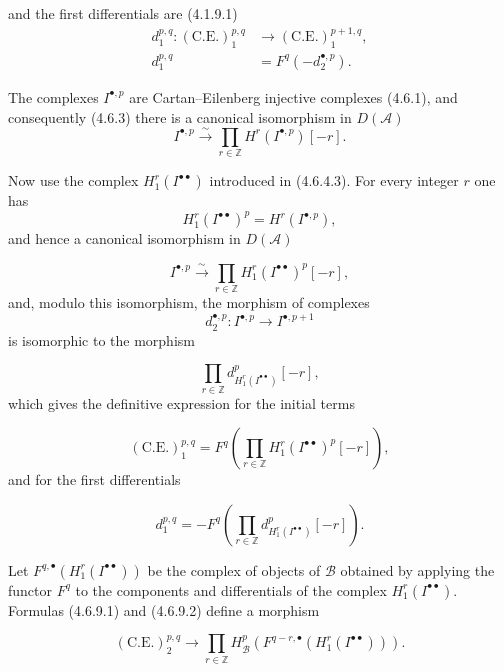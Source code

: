 \clearpage
{}%
\begingroup\small\setlength{\parskip}{0pt}\setlength{\emergencystretch}{1.5em}
\setlength{\abovedisplayskip}{4pt plus 2pt minus 2pt}%
\setlength{\belowdisplayskip}{4pt plus 2pt minus 2pt}%

\noindent and the first differentials are (4.1.9.1)
\[
\begin{aligned}
d_1^{p,q}\colon(\mathrm{C.E.})_1^{p,q}
  &\longrightarrow(\mathrm{C.E.})_1^{p+1,q},\\
d_1^{p,q}&=F^q(-d_2^{\bullet,p}).
\end{aligned}
\]

The complexes $I^{\bullet,p}$ are Cartan--Eilenberg injective complexes
(4.6.1), and consequently (4.6.3) there is a canonical isomorphism in
$D(\mathcal A)$
\[
I^{\bullet,p}\xrightarrow{\sim}
\prod_{r\in\mathbb Z}H^r(I^{\bullet,p})[-r].
\]

Now use the complex $H_1^r(I^{\bullet\bullet})$ introduced in (4.6.4.3).
For every integer $r$ one has
\[
H_1^r(I^{\bullet\bullet})^p=H^r(I^{\bullet,p}),
\]
and hence a canonical isomorphism in $D(\mathcal A)$

\[
I^{\bullet,p}\xrightarrow{\sim}
\prod_{r\in\mathbb Z}H_1^r(I^{\bullet\bullet})^p[-r],
\]
and, modulo this isomorphism, the morphism of complexes
\[
d_2^{\bullet,p}\colon
I^{\bullet,p}\longrightarrow I^{\bullet,p+1}
\]
is isomorphic to the morphism

\[
\prod_{r\in\mathbb Z}
d_{H_1^r(I^{\bullet\bullet})}^{p}[-r],
\]
which gives the definitive expression for the initial terms

\[
(\mathrm{C.E.})_1^{p,q}
=F^q\left(
\prod_{r\in\mathbb Z}H_1^r(I^{\bullet\bullet})^p[-r]
\right),
\tag{4.6.9.1}
\]
and for the first differentials

\[
d_1^{p,q}
=-F^q\left(
\prod_{r\in\mathbb Z}d_{H_1^r(I^{\bullet\bullet})}^{p}[-r]
\right).
\tag{4.6.9.2}
\]

Let $F^{q,\bullet}(H_1^r(I^{\bullet\bullet}))$ be the complex of objects
of $\mathcal B$ obtained by applying the functor $F^q$ to the components
and differentials of the complex $H_1^r(I^{\bullet\bullet})$. Formulas
(4.6.9.1) and (4.6.9.2) define a morphism

\[
(\mathrm{C.E.})_2^{p,q}\longrightarrow
\prod_{r\in\mathbb Z}
H_{\mathcal B}^{p}\left(
F^{q-r,\bullet}(H_1^r(I^{\bullet\bullet}))
\right).
\tag{4.6.9.3}
\]
\endgroup
